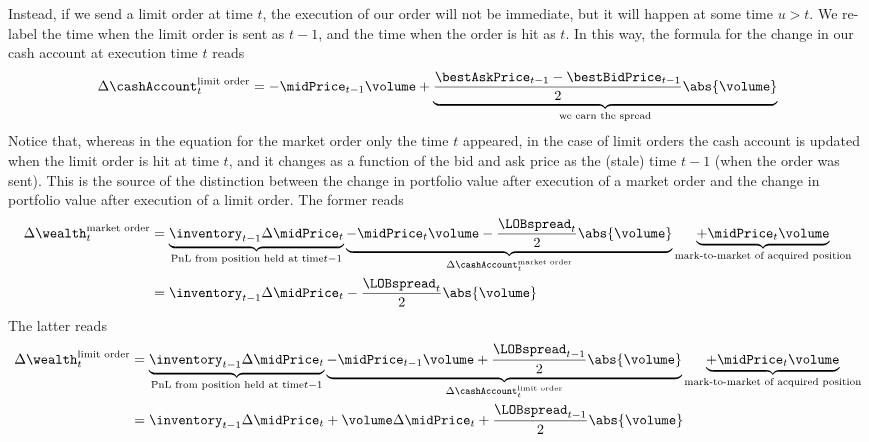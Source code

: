 Instead,
if we send a limit order at time $t$,
the execution of our order will not be immediate,
but it will happen at some time $u>t$.
We re-label the time when the limit order is sent as $t-1$,
and the time when the order is hit as $t$.
In this way,
the formula for the change in our cash account at execution time $t$ reads
\begin{equation}
\label{eq.cashLimitOrder}
	\Delta \cashAccount_t^{\text{limit order}}
	=
	-\midPrice_{t-1}\volume
+
	\underbrace{\frac{\bestAskPrice_{t-1} - \bestBidPrice_{t-1}}{2}\abs{\volume}}_{\text{we earn the spread}}
\end{equation}
Notice that,
whereas in the equation for the market order only the time $t$ appeared,
in the case of limit orders
the cash account is updated
when the limit order is hit at time $t$,
and it changes as a function of the bid and ask price as the (stale)
time $t-1$ (when the order was sent).
This is the source of the distinction between
the change in portfolio value after execution of a market order
and
the change in portfolio value after execution of a limit order.
The former reads
\begin{equation}
\label{eq.wealthMarketOrder}
	\begin{split}
		\Delta \wealth_t^{\text{market order}}
		&=
		\underbrace{
			\inventory_{t-1}\Delta \midPrice_t}_{\text{PnL from position held at time} t-1}
		\underbrace{
			-\midPrice_{t}\volume
		- \frac{\LOBspread_t}{2}\abs{\volume}
	}_{\Delta \cashAccount_t^{\text{market order}}}
		\underbrace{
			+\midPrice_t \volume
		}_{\text{mark-to-market of acquired position}}
		\\
		&=
		\inventory_{t-1} \Delta \midPrice_t
		- \frac{\LOBspread_t}{2}\abs{\volume}
	\end{split}
\end{equation}
The latter reads
\begin{equation}
\label{eq.wealthLimitOrder}
	\begin{split}
		\Delta \wealth_t^{\text{limit order}}
		&=
		\underbrace{
			\inventory_{t-1}\Delta \midPrice_t}_{\text{PnL from position held at time} t-1}
		\underbrace{
			-\midPrice_{t-1}\volume
		+ \frac{\LOBspread_{t-1}}{2}\abs{\volume}
	}_{\Delta \cashAccount_t^{\text{limit order}}}
		\underbrace{
			+\midPrice_t \volume
		}_{\text{mark-to-market of acquired position}}
		\\
		&=
		\inventory_{t-1} \Delta \midPrice_t
		+\volume \Delta \midPrice_t
		+ \frac{\LOBspread_{t-1}}{2}\abs{\volume}
	\end{split}
\end{equation}

